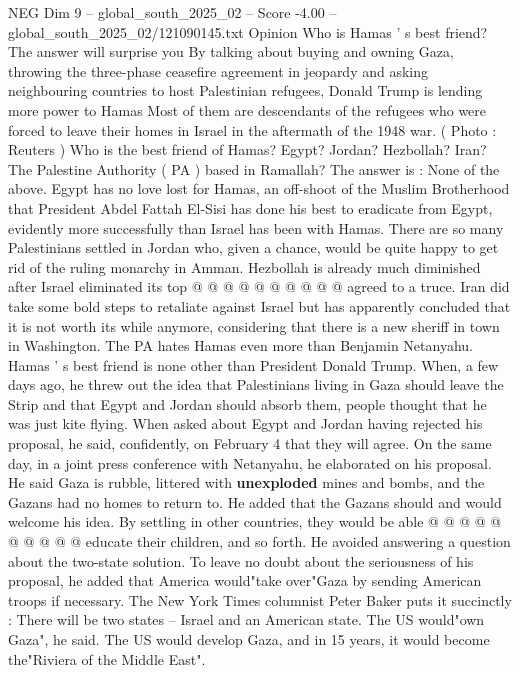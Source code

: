 \begin{textsample}{NEG Dim 9 – global\_south\_2025\_02 – Score -4.00 – global\_south\_2025\_02/121090145.txt}  \label{ex:f9_neg_065}
Opinion Who is Hamas ' s best friend?
The answer will surprise you By talking about buying and owning Gaza, throwing the three-phase ceasefire agreement in jeopardy and asking neighbouring countries to host Palestinian refugees, Donald Trump is lending more power to Hamas Most of them are descendants of the refugees who were forced to leave their homes in Israel in the aftermath of the 1948 war. ( Photo : Reuters ) Who is the best friend of Hamas?
Egypt?
Jordan?
Hezbollah?
Iran?
The Palestine Authority ( PA ) based in Ramallah?
The answer is : None of the above.
Egypt has no love lost for Hamas, an off-shoot of the Muslim Brotherhood that President Abdel Fattah El-Sisi has done his best to eradicate from Egypt, evidently more successfully than Israel has been with Hamas.
There are so many Palestinians settled in Jordan who, given a chance, would be quite happy to get rid of the ruling monarchy in Amman.
Hezbollah is already much diminished after Israel eliminated its top @ @ @ @ @ @ @ @ @ @ agreed to a truce.
Iran did take some bold steps to retaliate against Israel but has apparently concluded that it is not worth its while anymore, considering that there is a new sheriff in town in Washington.
The PA hates Hamas even more than Benjamin Netanyahu.
Hamas ' s best friend is none other than President Donald Trump.
When, a few days ago, he threw out the idea that Palestinians living in Gaza should leave the Strip and that Egypt and Jordan should absorb them, people thought that he was just kite flying.
When asked about Egypt and Jordan having rejected his proposal, he said, confidently, on February 4 that they will agree.
On the same day, in a joint press conference with Netanyahu, he elaborated on his proposal.
He said Gaza is rubble, littered with \textbf{unexploded} mines and bombs, and the Gazans had no homes to return to.
He added that the Gazans should and would welcome his idea.
By settling in other countries, they would be able @ @ @ @ @ @ @ @ @ @ educate their children, and so forth.
He avoided answering a question about the two-state solution.
To leave no doubt about the seriousness of his proposal, he added that America would"take over"Gaza by sending American troops if necessary.
The New York Times columnist Peter Baker puts it succinctly : There will be two states -- Israel and an American state.
The US would"own Gaza", he said.
The US would develop Gaza, and in 15 years, it would become the"Riviera of the Middle East".

\end{textsample}
